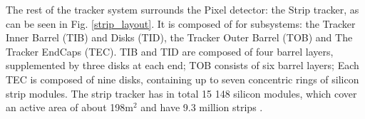 The rest of the tracker system surrounds the Pixel detector: the Strip tracker, as can be seen in Fig. \ref{strip_layout}. It is composed of for subsystems: the Tracker Inner Barrel (TIB) and Disks (TID), the Tracker Outer Barrel (TOB) and The Tracker EndCaps (TEC). TIB and TID are composed of four barrel layers, supplemented by three disks at each end; TOB consists of six barrel layers; Each TEC is composed of nine disks, containing up to seven concentric rings of silicon strip modules. The strip tracker has in total  15 148 silicon modules, which cover an active area of about 198$\text{m}^{2}$ and have 9.3 million strips \cite{CMS_Exp_2008}.
